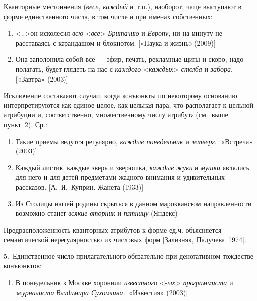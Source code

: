 Кванторные местоимения (\emph{весь}, \emph{каждый} и~т.п.), наоборот,
чаще выступают в форме единственного числа, в том числе и при именах
собственных:

\begin{enumerate}
\def\labelenumi{(\arabic{enumi})}
\setcounter{enumi}{135}
\item
  \textless..\textgreater он исколесил \emph{всю}
  \textless*\emph{все}\textgreater{} \emph{Британию} и \emph{Европу}, ни
  на минуту не расставаясь с карандашом и блокнотом. {[}«Наука и жизнь»
  (2009){]}
\item
  Она заполонила собой всё ― эфир, печать, рекламные щиты и скоро, надо
  полагать, будет глядеть на нас с \emph{каждого}
  \textless*\emph{каждых}\textgreater{} \emph{столба} и \emph{забора}.
  {[}«Завтра» (2003){]}
\end{enumerate}

Исключение составляют случаи, когда конъюнкты по некоторому основанию
интерпретируются как единое целое, как цельная пара, что располагает к
цельной атрибуции и, соответственно, множественному числу атрибута
(см.~выше \underline{пункт~2}). Ср.:

\begin{enumerate}
\def\labelenumi{(\arabic{enumi})}
\setcounter{enumi}{137}
\item
  Такие приемы ведутся регулярно, \emph{каждые понедельник} и
  \emph{четверг}. {[}«Встреча» (2003){]}
\item
  Каждый листик, каждые зверь и зверюшка, \emph{каждые} \emph{жуки} и
  \emph{мушки} являлись для него и для детей предметами жадного внимания
  и удивительных рассказов. {[}А.~И.~Куприн. Жанета (1933){]}
\item
  Из Столицы нашей родины скрыться в данном марокканском направленности
  возможно станет \emph{всякие} \emph{вторник} и \emph{пятницу} (Яндекс)
\end{enumerate}

Предрасположенность кванторных атрибутов к форме ед.ч. объясняется
семантической нерегулярностью их числовых форм
{[}Зализняк,~Падучева~1974{]}.

5.~Единственное число прилагательного обязательно при денотативном
тождестве конъюнктов:

\begin{enumerate}
\def\labelenumi{(\arabic{enumi})}
\setcounter{enumi}{140}
\item
  В понедельник в Москве хоронили \emph{известного}
  \textless*-\emph{ых}\textgreater{} \emph{программиста} и
  \emph{журналиста} \emph{Владимира Сухомлина}. {[}«Известия» (2003){]}
\end{enumerate}

